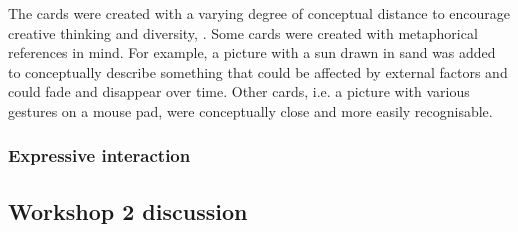 The cards were created with a varying degree of conceptual distance to encourage creative thinking and diversity, \citep[chap. 10]{benyon2005designing}.
Some cards were created with metaphorical references in mind.
For example, a picture with a sun drawn in sand was added to conceptually describe something that could be affected by external factors and could fade and disappear over time.
Other cards, i.e. a picture with various gestures on a mouse pad, were conceptually close and more easily recognisable.

\subsubsection{Expressive interaction}

\subsection{Workshop 2 discussion}
\label{ch:workshops:workshop-ii:discussion}

